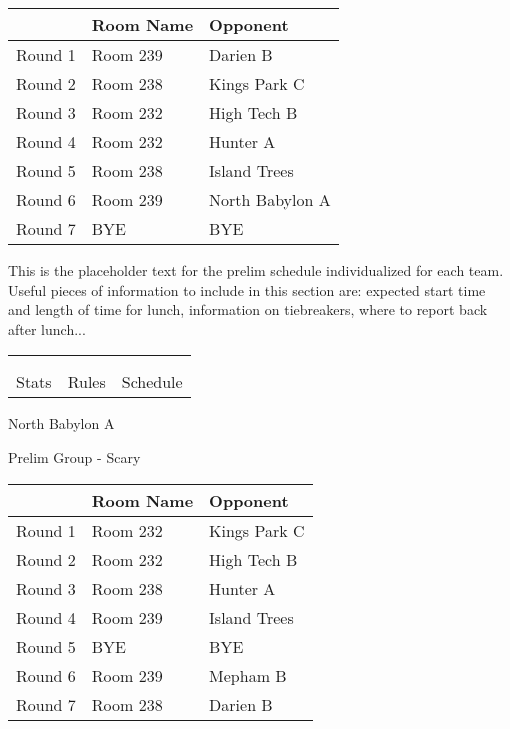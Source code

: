 \documentclass{article}%
\begin{document}
\vspace*{4pt}%
\begin{tabularx}{\textwidth}{|c|Y|Y|}%
\hline%
&Room Name&Opponent\\%
\hline%
Round 1&Room 239&Darien B\\%
Round 2&Room 238&Kings Park C\\%
Round 3&Room 232&High Tech B\\%
Round 4&Room 232&Hunter A\\%
Round 5&Room 238&Island Trees\\%
Round 6&Room 239&North Babylon A\\%
Round 7&BYE&BYE\\%
\hline%
\end{tabularx}%
\vspace*{30pt}%
\linebreak%
This is the placeholder text for the prelim schedule individualized for each team. Useful pieces of information to include in this section are: expected start time and length of time for lunch, information on tiebreakers, where to report back after lunch...%
\vspace*{30pt}%
\newline%
%
\begin{tabularx}{\textwidth}{YYY}%
  &  &  \\%
\\%
Stats&Rules&Schedule\\%
\end{tabularx}%
\newpage%
%
\begin{center}%
\begin{Huge}%
North Babylon A%
\end{Huge}%
\vspace*{12pt}%
\linebreak%
\begin{Large}%
Prelim Group {-} Scary%
\end{Large}%
\end{center}%
\vspace*{4pt}%
\begin{tabularx}{\textwidth}{|c|Y|Y|}%
\hline%
&Room Name&Opponent\\%
\hline%
Round 1&Room 232&Kings Park C\\%
Round 2&Room 232&High Tech B\\%
Round 3&Room 238&Hunter A\\%
Round 4&Room 239&Island Trees\\%
Round 5&BYE&BYE\\%
Round 6&Room 239&Mepham B\\%
Round 7&Room 238&Darien B\\%
\hline%
\end{tabularx}%
\end{document}
